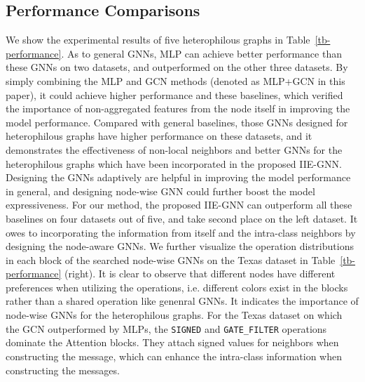 \documentclass[sigconf]{acmart}
\begin{document}
\subsection{Performance Comparisons}
We show the experimental results of five heterophilous graphs in Table~\ref{tb-performance}. 
As to general GNNs, MLP can achieve better performance than these GNNs on two datasets, and outperformed on the other three datasets. By simply combining the MLP and GCN methods (denoted as MLP+GCN \cite{ma2021homophily} in this paper), it could achieve higher performance and these baselines, which verified the importance of non-aggregated features from the node itself in improving the model performance.
Compared with general baselines, those GNNs designed for heterophilous graphs have higher performance on these datasets, and it demonstrates the effectiveness of non-local neighbors and better GNNs for the heterophilous graphs which have been incorporated in the proposed IIE-GNN.
Designing the GNNs adaptively are helpful in improving the model performance in general, and designing node-wise GNN could further boost the model expressiveness.
For our method, the proposed IIE-GNN can outperform all these baselines on four datasets out of five, and take second place on the left dataset. It owes to incorporating the information from itself and the intra-class neighbors by designing the node-aware GNNs.
We further visualize the operation distributions in each block of the searched node-wise GNNs on the Texas dataset in Table~\ref{tb-performance} (right). It is clear to observe that different nodes have different preferences when utilizing the operations, i.e. different colors exist in the blocks rather than a shared operation like genenral GNNs. It indicates the importance of node-wise GNNs for the heterophilous graphs. 
For the Texas dataset on which the GCN outperformed by MLPs, the \texttt{SIGNED} and \texttt{GATE\_FILTER} operations dominate the Attention blocks. They attach signed values for neighbors when constructing the message, which can enhance the intra-class information when constructing the messages. 
\end{document}
